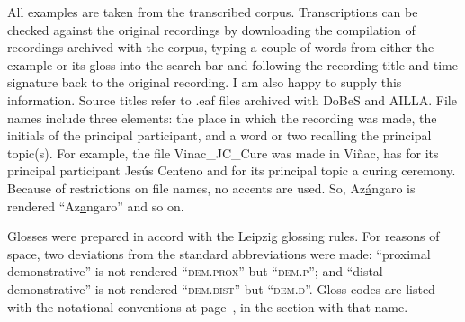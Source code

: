 \vspace{\baselineskip}
All examples are taken from the transcribed corpus. Transcriptions can be checked against the original recordings by downloading the compilation of recordings archived with the corpus, typing a couple of words from either the example or its gloss into the search bar and following the recording title and time signature back to the original recording. I am also happy to supply this information. Source titles refer to \textrm{.eaf} files archived with DoBeS and AILLA. File names include three elements: the place in which the recording was made, the initials of the principal participant, and a word or two recalling the principal topic(s). For example, the file \textrm{Vinac\_JC\_Cure} was made in Vi\~nac, has for its principal participant Jes\'us Centeno and for its principal topic a curing ceremony. Because of restrictions on file names, no accents are used. So, Az\underline{\'a}ngaro is rendered ``Az\underline{a}ngaro'' and so on.

Glosses were prepared in accord with the Leipzig glossing rules. For reasons of space, two deviations from the standard abbreviations were made: ``proximal demonstrative'' is not rendered ``\textsc{dem.prox}'' but ``\textsc{dem.p}''; and ``distal demonstrative'' is not rendered ``\textsc{dem.dist}'' but ``\textsc{dem.d}''. Gloss codes are listed with the notational conventions at page~\pageref{ch:notconv}, in the section with that name.
